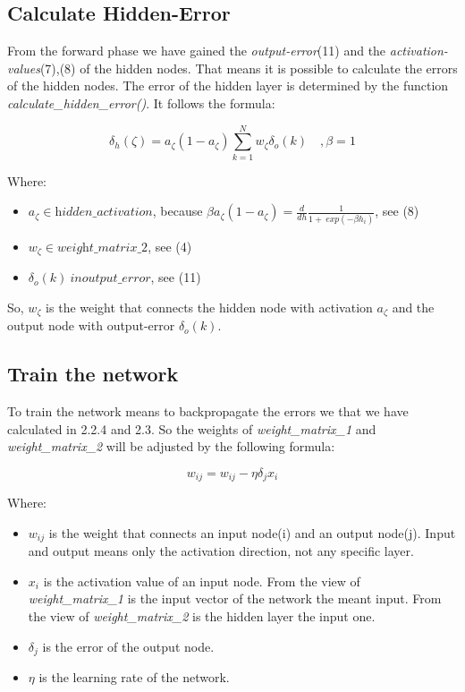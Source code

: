 \documentclass[10pt,a4paper]{article}
\begin{document}
  	\subsection{Calculate Hidden-Error}								%
	From the forward phase we have gained the \textit{output-error}(11) and the \textit{activation-values}(7),(8) of the hidden nodes. That means it is possible to calculate the errors of the hidden nodes. The error of the hidden layer is determined by the function \textit{calculate\_hidden\_error()}. It follows the formula: \\
	 \begin{center}
		\begin{equation}
		\delta_h(\zeta) = a_{\zeta}(1-a_{\zeta}) \sum_{k=1}^{N} w_{\zeta}\delta_o(k) \quad, \beta =1
		\end{equation} 
	\end{center}
	Where:
	\begin{itemize}
		\item $ a_{\zeta} \in \textit{hidden\_activation} $, because $ \beta a_{\zeta}(1-a_{\zeta}) = \frac{d}{dh} \frac{1}{1 + \ exp(-\beta h_i)}$, see (8)
		\item $ w_{\zeta} \in \textit{weight\_matrix\_2}$, see (4)
		\item $ \delta_o(k) \ in \textit{output\_error} $, see (11)
	\end{itemize}
	So, $w_{\zeta}$ is the weight that connects the hidden node with activation $a_{\zeta}$ and the output node with output-error $\delta_o(k)$.
	\subsection{Train the network}				%
	To train the network means to backpropagate the errors we that we have calculated in 2.2.4 and 2.3. So the weights of \textit{weight\_matrix\_1} and \textit{weight\_matrix\_2} will be adjusted by the following formula:
	\begin{center}
		\begin{equation}
		w_{ij} = w_{ij} - \eta \delta_j x_i
		\end{equation} 
	\end{center}
	Where:
	\begin{itemize}
		\item $w_{ij}$ is the weight that connects an input node(i) and an output node(j). Input and output means only the activation direction, not any specific layer.
		\item $x_i$ is the activation value of an input node. From the view of \textit{weight\_matrix\_1} is the input vector of the network the meant input. From the view of \textit{weight\_matrix\_2} is the hidden layer the input one.
		\item  $\delta_j$ is the error of the output node.
		\item $\eta$ is the learning rate of the network. 

	\end{itemize}   
\end{document}
